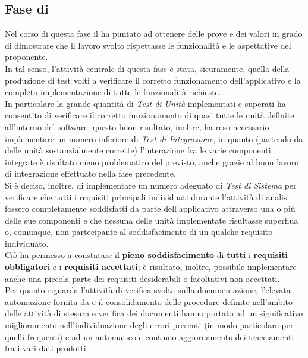 \subsection{Fase di \fVVt}
Nel corso di questa fase il  ha puntato ad ottenere delle prove e dei valori in grado di dimostrare che il lavoro svolto rispettasse le funzionalità e le aspettative del proponente.\\
In tal senso, l'attività centrale di questa fase è stata, sicuramente, quella della produzione di test volti a verificare il corretto funzionamento dell'applicativo e la completa implementazione di tutte le funzionalità richieste.\\
In particolare la grande quantità di \textit{Test di Unità} implementati e superati ha consentito di verificare il corretto funzionamento di quasi tutte le unità definite all'interno del software; questo buon risultato, inoltre, ha reso necessario implementare un numero inferiore di \textit{Test di Integrazione}, in quanto (partendo da delle unità sostanzialmente corrette) l'interazione fra le varie componenti integrate è risultato meno problematico del previsto, anche grazie al buon lavoro di integrazione effettuato nella fase precedente.\\
Si è deciso, inoltre, di implementare un numero adeguato di \textit{Test di Sistema} per verificare che tutti i requisiti principali individuati durante l'attività di analisi fossero completamente soddisfatti da parte dell'applicativo attraverso una o più delle sue componenti e che nessuna delle unità implementate risultasse superflua o, comunque, non partecipante al soddisfacimento di un qualche requisito individuato.\\
Ciò ha permesso a constatare il \textbf{pieno soddisfacimento} di \textbf{tutti} i \textbf{requisiti obbligatori} e i \textbf{requisiti accettati}; è risultato, inoltre, possibile implementare anche una piccola parte dei requisiti desiderabili o facoltativi non accettati.\\  
Per quanto riguarda l'attività di verifica svolta sulla documentazione, l'elevata automazione fornita da \pragmadb e il consolidamento delle procedure definite nell'ambito delle attività di stesura e verifica dei documenti hanno portato ad un significativo miglioramento nell'individuazione degli errori presenti (in modo particolare per quelli frequenti) e ad un automatico e continuo aggiornamento dei tracciamenti fra i vari dati prodotti.
